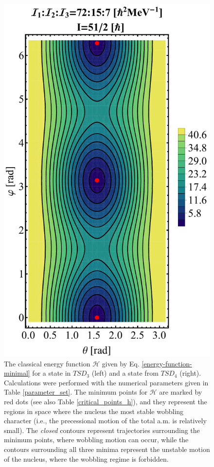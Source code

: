 \documentclass[myclassdoc,debug]{rjparticle}
\begin{document}
\begin{figure}
\begin{minipage}{.5\textwidth}
\end{minipage}%
\begin{minipage}{.5\textwidth}
  \centering
 \includegraphics[scale=0.3]{figs/contour-tsd4.pdf}
\end{minipage}
\caption{The classical energy function $\mathcal{H}$ given by Eq. \ref{energy-function-minimal} for a state in $TSD_3$ (left) and a state from $TSD_4$ (right). Calculations were performed with the numerical parameters given in Table \ref{parameter_set}. The minimum points for $\mathcal{H}$ are marked by red dots (see also Table \ref{critical_points_h}), and they represent the regions in space where the nucleus the most stable wobbling character (i.e., the precessional motion of the total a.m. is relatively small). The \emph{closed} contours represent trajectories surrounding the minimum points, where wobbling motion can occur, while the contours surrounding all three minima represent the unstable motion of the nucleus, where the wobbling regime is forbidden.}
    \label{contours-34}
\end{figure}
\end{document}
